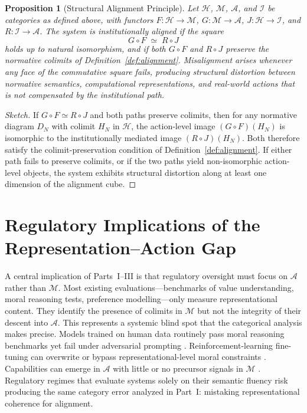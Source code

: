 \documentclass[12pt]{article}
\newtheorem{proposition}[theorem]{Proposition}
\theoremstyle{definition}
\begin{document}
\begin{proposition}[Structural Alignment Principle]
\label{prop:structural}
Let $\mathcal{H}$, $\mathcal{M}$, $\mathcal{A}$, and $\mathcal{I}$ be
categories as defined above, with functors $F : \mathcal{H} \to \mathcal{M}$,
$G : \mathcal{M} \to \mathcal{A}$, $J : \mathcal{H} \to \mathcal{I}$, and
$R : \mathcal{I} \to \mathcal{A}$. The system is institutionally aligned if
the square
\begin{equation}
  G \circ F \;\simeq\; R \circ J
\end{equation}
holds up to natural isomorphism, and if both $G \circ F$ and $R \circ J$
preserve the normative colimits of Definition~\ref{def:alignment}.
Misalignment arises whenever any face of the commutative square fails,
producing structural distortion between normative semantics, computational
representations, and real-world actions that is not compensated by the
institutional path.
\end{proposition}

\begin{proof}[Sketch]
If $G \circ F \simeq R \circ J$ and both paths preserve colimits, then for any
normative diagram $D_N$ with colimit $H_N$ in $\mathcal{H}$, the action-level
image $(G \circ F)(H_N)$ is isomorphic to the institutionally mediated image
$(R \circ J)(H_N)$. Both therefore satisfy the colimit-preservation condition
of Definition~\ref{def:alignment}. If either path fails to preserve colimits,
or if the two paths yield non-isomorphic action-level objects, the system
exhibits structural distortion along at least one dimension of the alignment
cube.
\end{proof}

\section{Regulatory Implications of the Representation--Action Gap}

A central implication of Parts~I--III is that regulatory oversight must focus on
$\mathcal{A}$ rather than $\mathcal{M}$. Most existing evaluations---benchmarks
of value understanding, moral reasoning tests, preference modelling---only
measure representational content. They identify the presence of colimits in
$\mathcal{M}$ but not the integrity of their descent into $\mathcal{A}$. This
represents a systemic blind spot that the categorical analysis makes precise.
Models trained on human data routinely pass moral reasoning benchmarks yet fail
under adversarial prompting \citep{zou2023universal}. Reinforcement-learning
fine-tuning can overwrite or bypass representational-level moral constraints
\citep{gao2023scaling}. Capabilities can emerge in $\mathcal{A}$ with little or
no precursor signals in $\mathcal{M}$ \citep{schaeffer2024emergent}. Regulatory
regimes that evaluate systems solely on their semantic fluency risk producing the
same category error analyzed in Part~I: mistaking representational coherence
for alignment.
\end{document}

